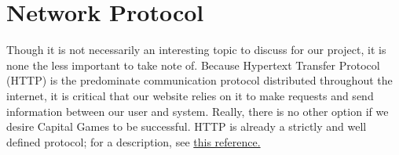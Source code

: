 \section{Network Protocol}
Though it is not necessarily an interesting topic to discuss for our project, it is none the less important to take note of. Because Hypertext Transfer Protocol (HTTP) is the predominate communication protocol distributed throughout the internet, it is critical that our website relies on it to make requests and send information between our user and system. Really, there is no other option if we desire Capital Games to be successful. HTTP is already a strictly and well defined protocol; for a description, see \href{http://en.wikipedia.org/wiki/Hypertext_Transfer_Protocol}{this reference.} \\
